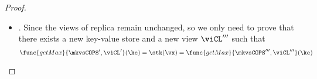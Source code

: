 \begin{proof}
\begin{itemize}
\begin{equation}
\begin{array}{@{}l@{}}
        \end{array}
    \end{equation}
    Note that the \( \txid \) is greater than any writers \( \txidCOPS{\repl}{\cl}{n'}{0} \) that can be observed by the \( \viREPL \), so is \( \txid' \).
    That is,
    \begin{equation}
        \label{equ:get-max-match-overwritten-key}
        \begin{array}{@{}l@{}}
            \func{getMax}{\mkvsCOPS', \viREPL'}(\ke) = \stk(\vx) = \func{getMax}{\mkvsCOPS''', \viREPL'''}(\ke)  \\
            {} \land \func{getMax}{\mkvsCOPS', \viCL'}(\ke) = \stk(\vx) = \func{getMax}{\mkvsCOPS''', \viCL'''}(\ke) 
        \end{array}
    \end{equation}
    Combine \cref{equ:get-max-match-all-other-key} and \cref{equ:get-max-match-overwritten-key},
    we have the proof.

    \item {}.
    Since the views of replica remain unchanged, so we only need to prove that there exists a new key-value store and a new view \( \viCL''' \) such that
    \[
        \func{getMax}{\mkvsCOPS', \viCL'}(\ke) = \stk(\vx) = \func{getMax}{\mkvsCOPS''', \viCL'''}(\ke) 
    \]
    
\end{itemize}
\end{proof}
